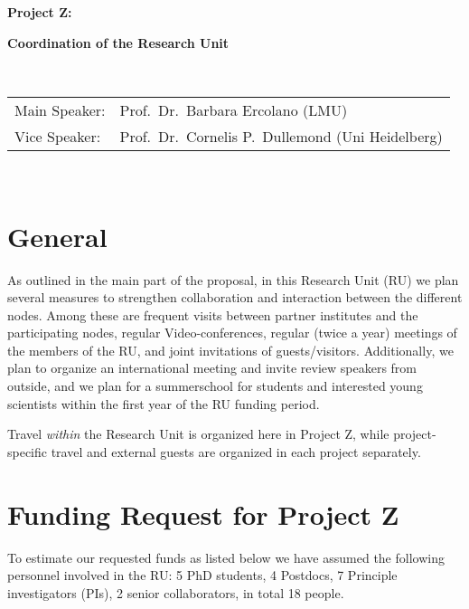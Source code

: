 \documentclass[10pt,fleqn,twoside,a4paper]{article}
\begin{document}
\newpage


\setcounter{page}{177}

\centerline{\huge\bf\Tcol
%
%
%
%
%
 Project Z:}
\vspace{1em}

\centerline{\LARGE\bf\Tcol Coordination of the Research Unit}

%
%
%
%
%
\vskip1.0cm


\\
\begin{tabular}{ll}
{\textsf{Main Speaker:}}   & Prof.\ Dr.\ Barbara Ercolano (LMU)\\
{\textsf{Vice Speaker:}}   & Prof.\ Dr.\ Cornelis P.~Dullemond (Uni Heidelberg)
\end{tabular}


\vspace{1em}
 \\


\section{General}
%
As outlined in the main part of the proposal, in this Research Unit (RU) we
plan several measures to strengthen collaboration and interaction between
the different nodes.  Among these are frequent visits between partner
institutes and the participating nodes, regular Video-conferences, regular
(twice a year) meetings of the members of the RU, and joint invitations of
guests/visitors. Additionally, we plan to organize an international meeting
and invite review speakers from outside, and we plan for a summerschool for
students and interested young scientists within the first year of the RU
funding period.

Travel {\em within} the Research Unit is organized here in Project Z, 
while project-specific travel and external guests are organized in each
project separately. 



%
\section{Funding Request for Project Z}
%
To estimate our requested funds as listed below we have assumed the
following personnel involved in the RU: 5 PhD students, 4 Postdocs, 7
Principle investigators (PIs), 2 senior collaborators, in total 18 people.
\end{document}
